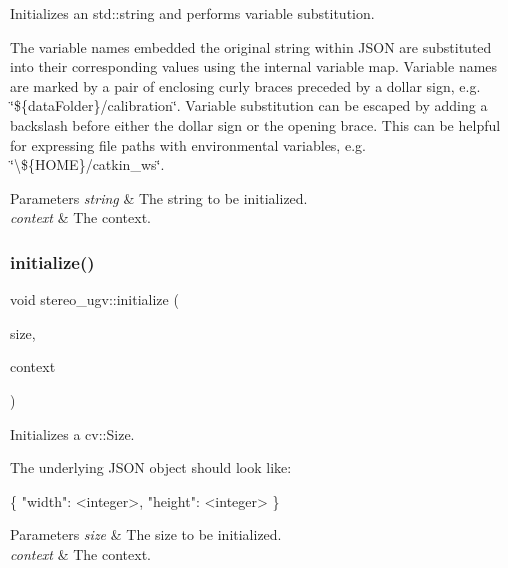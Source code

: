 Initializes an std\+::string and performs variable substitution. 

The variable names embedded the original string within J\+S\+ON are substituted into their corresponding values using the internal variable map. Variable names are marked by a pair of enclosing curly braces preceded by a dollar sign, e.\+g. \char`\"{}\$\{data\+Folder\}/calibration\char`\"{}. Variable substitution can be escaped by adding a backslash before either the dollar sign or the opening brace. This can be helpful for expressing file paths with environmental variables, e.\+g. \char`\"{}\textbackslash{}\$\{\+H\+O\+M\+E\}/catkin\+\_\+ws\char`\"{}. 
\begin{DoxyParams}{Parameters}
{\em string} & The string to be initialized. \\
\hline
{\em context} & The context. \\
\hline
\end{DoxyParams}
\mbox{\label{namespacestereo__ugv_adab204dc6f43824bcda4cd5e172d2812}} 
\subsubsection{\texorpdfstring{initialize()}{initialize()}\hspace{0.1cm}{\footnotesize\ttfamily [4/8]}}
{\footnotesize\ttfamily void stereo\+\_\+ugv\+::initialize (\begin{DoxyParamCaption}\item[{cv\+::\+Size $\ast$}]{size,  }\item[{const \hyperlink{classstereo__ugv_1_1Context}{Context} \&}]{context }\end{DoxyParamCaption})}



Initializes a cv\+::\+Size. 

The underlying J\+S\+ON object should look like\+: 
\begin{DoxyCode}
\{
  \textcolor{stringliteral}{"width"}: <integer>,
  \textcolor{stringliteral}{"height"}: <integer>
\}
\end{DoxyCode}
 
\begin{DoxyParams}{Parameters}
{\em size} & The size to be initialized. \\
\hline
{\em context} & The context. \\
\hline
\end{DoxyParams}
\mbox{\label{namespacestereo__ugv_aab7c44a98ba3f61baec2e4c1c9802bee}} 
